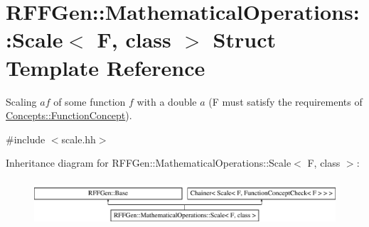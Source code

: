 \hypertarget{structRFFGen_1_1MathematicalOperations_1_1Scale}{\section{R\-F\-F\-Gen\-:\-:Mathematical\-Operations\-:\-:Scale$<$ F, class $>$ Struct Template Reference}
\label{structRFFGen_1_1MathematicalOperations_1_1Scale}
}


Scaling $ af $ of some function $ f $ with a double $ a $ (F must satisfy the requirements of \hyperlink{structRFFGen_1_1Concepts_1_1FunctionConcept}{Concepts\-::\-Function\-Concept}).  




{\ttfamily \#include $<$scale.\-hh$>$}

Inheritance diagram for R\-F\-F\-Gen\-:\-:Mathematical\-Operations\-:\-:Scale$<$ F, class $>$\-:\begin{figure}[H]
\begin{center}
\leavevmode
\includegraphics[height=1.717791cm]{structRFFGen_1_1MathematicalOperations_1_1Scale}
\end{center}
\end{figure}
